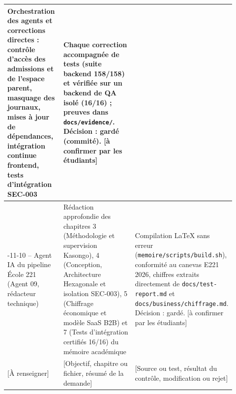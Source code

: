 \begin{table}[htbp]
\begin{tabular}{@{}>{\raggedright\arraybackslash}p{0.25\linewidth}>{\raggedright\arraybackslash}p{0.35\linewidth}>{\raggedright\arraybackslash}p{0.32\linewidth}@{}}
    Orchestration des agents et corrections directes : contrôle d'accès des admissions et de l'espace parent, masquage des journaux, mises à jour de dépendances, intégration continue frontend, tests d'intégration SEC-003 &
    Chaque correction accompagnée de tests (suite backend 158/158) et vérifiée sur un backend de QA isolé (16/16) ; preuves dans \texttt{docs/evidence/}. Décision : gardé (commité). {[à confirmer par les étudiants]} \\
    \midrule
    2026-11-10 -- Agent IA du pipeline École 221 (Agent 09, rédacteur technique) &
    Rédaction approfondie des chapitres 3 (Méthodologie et supervision Kasongo), 4 (Conception, Architecture Hexagonale et isolation SEC-003), 5 (Chiffrage économique et modèle SaaS B2B) et 7 (Tests d'intégration certifiés 16/16) du mémoire académique &
    Compilation LaTeX sans erreur (\texttt{memoire/scripts/build.sh}), conformité au canevas E221 2026, chiffres extraits directement de \texttt{docs/test-report.md} et \texttt{docs/business/chiffrage.md}. Décision : gardé. {[à confirmer par les étudiants]} \\
    \midrule
    {[À renseigner]} & {[Objectif, chapitre ou fichier, résumé de la demande]} & {[Source ou test, résultat du contrôle, modification ou rejet]} \\
    \bottomrule
  \end{tabular}
\end{table}
